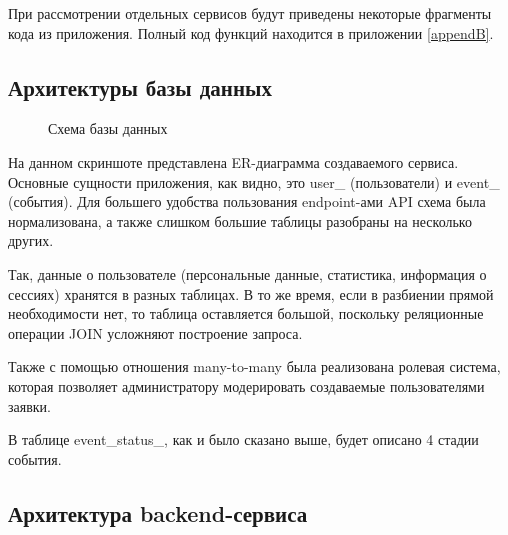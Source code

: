 \documentclass[diploma]{SCWorks}
\begin{document}
При рассмотрении отдельных сервисов будут приведены некоторые фрагменты кода
из приложения. Полный код функций находится в приложении \ref{appendB}.

\subsection{Архитектуры базы данных}

\begin{figure}[H]
	\caption{Схема базы данных}
	\label{pic:database}
\end{figure}

На данном скриншоте представлена ER-диаграмма создаваемого сервиса. Основные
сущности приложения, как видно, это user\_ (пользователи) и event\_ (события). 
Для большего удобства пользования endpoint-ами API схема была 
нормализована, а также слишком большие таблицы разобраны на несколько других.

Так, данные о пользователе (персональные данные, статистика, информация о 
сессиях) хранятся в разных таблицах. В то же время, если в разбиении 
прямой необходимости нет, то таблица оставляется
большой, поскольку реляционные операции JOIN усложняют построение запроса.

Также с помощью отношения many-to-many была реализована ролевая система, 
которая позволяет администратору модерировать создаваемые пользователями заявки.

В таблице event\_status\_, как и было сказано выше, будет описано 4 стадии события.

\subsection{Архитектура backend-сервиса}
\end{document}

